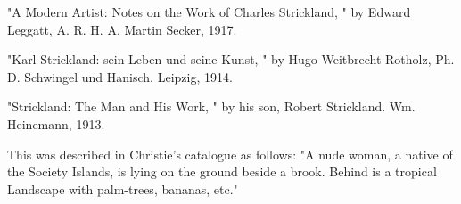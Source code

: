 \documentclass{article}
\begin{document}
\begin{thebibliography}{99}
	 "A Modern Artist: Notes on the Work of Charles Strickland, " by Edward Leggatt, A. R. H. A. Martin Secker, 1917.\par
	 "Karl Strickland: sein Leben und seine Kunst, " by Hugo Weitbrecht-Rotholz, Ph. D. Schwingel und Hanisch. Leipzig, 1914.\par
	 "Strickland: The Man and His Work, " by his son, Robert Strickland. Wm. Heinemann, 1913.\par
	 This was described in Christie's catalogue as follows: "A nude woman, a native of the Society Islands, is lying on the ground beside a brook. Behind is a tropical Landscape with palm-trees, bananas, etc."\par
\end{thebibliography}
\end{document}
